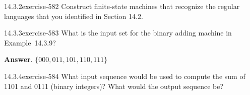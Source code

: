 \documentclass[twoside,10pt,]{book}
\numberwithin{equation}{section}
\begin{document}
\begin{divisionsolution}{14.3.2}{}{exercise-582}%
\hypertarget{p-5229}{}%
Construct finite-state machines that recognize the regular languages that you identified in Section 14.2.%
\end{divisionsolution}%
\begin{divisionsolution}{14.3.3}{}{exercise-583}%
\hypertarget{p-5230}{}%
What is the input set for the binary adding machine in Example~14.3.9?%
\par\smallskip%
\noindent\textbf{Answer}.\quad%
\hypertarget{p-5231}{}%
\(\{000, 011, 101, 110, 111\}\)%
\end{divisionsolution}%
\begin{divisionsolution}{14.3.4}{}{exercise-584}%
\hypertarget{p-5232}{}%
What input sequence would be used to compute the sum of 1101 and 0111 (binary integers)? What would the output sequence be?%
\end{divisionsolution}%
\end{document}
